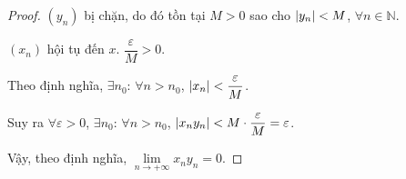 \documentclass[class=analysis,crop=false]{standalone}
\begin{document}
\begin{proof}
    \par $(y_{n})$ bị chặn, do đó tồn tại $M > 0$ sao cho $\left\vert{y_{n}}\right\vert < M$, $\forall n\in\mathbb{N}$.
    \par $(x_{n})$ hội tụ đến $x$. $\dfrac{\varepsilon}{M} > 0$.
    \par Theo định nghĩa, $\exists n_{0}$: $\forall n > n_{0}$, $\left\vert{x_{n}}\right\vert < \dfrac{\varepsilon}{M}$.
    \par Suy ra $\forall\varepsilon > 0$, $\exists n_{0}$: $\forall n > n_{0}$, $\left\vert{x_{n}y_{n}}\right\vert < M\cdot\dfrac{\varepsilon}{M} = \varepsilon$.
    \par Vậy, theo định nghĩa, $\lim\limits_{n\to+\infty} x_{n}y_{n} = 0$.
\end{proof}
\end{document}
